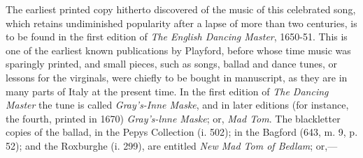 The earliest printed copy hitherto discovered of the music of this celebrated
song, which retains undiminished popularity after a lapse of more than two centuries, 
is to be found in the first edition of \textit{The English Dancing Master}, 1650-51.
This is one of the earliest known publications by Playford, before whose time music
was sparingly printed, and small pieces, such as songs, ballad and dance tunes, or
lessons for the virginals, were chiefly to be bought in manuscript, as they are in
many parts of Italy at the present time. In the first edition of \textit{The Dancing
Master} the tune is called \textit{Gray's-Inne Maske}, and in later editions (for instance,
the fourth, printed in 1670) \textit{Gray's-lnne Maske}; or, \textit{Mad Tom}. The blackletter
copies of the ballad, in the Pepys Collection (i. 502); in the Bagford
(643, m. 9, p. 52); and the Roxburghe (i. 299), are entitled \textit{New Mad Tom of
Bedlam}; or,—
\settowidth{\versewidth}{The Man in the Moone drinks claret}
